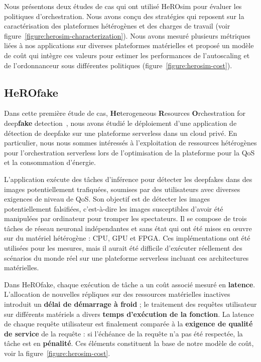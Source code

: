 Nous présentons deux études de cas qui ont utilisé HeROsim pour évaluer les politiques d'orchestration.
Nous avons conçu des stratégies qui reposent sur la caractérisation des plateformes hétérogènes et des charges de travail (voir figure~\ref{figure:herosim-characterization}). Nous avons mesuré plusieurs métriques liées à nos applications sur diverses plateformes matérielles et proposé un modèle de coût qui intègre ces valeurs pour estimer les performances de l'autoscaling et de l'ordonnanceur sous différentes politiques (figure~\ref{figure:herosim-cost}).

\subsection{HeROfake}

Dans cette première étude de cas, \textbf{He}terogeneous \textbf{R}esources \textbf{O}rchestration for deep\textbf{fake} detection~\cite{herofake}, nous avons étudié le déploiement d'une application de détection de deepfake sur une plateforme serverless dans un cloud privé. En particulier, nous nous sommes intéressés à l'exploitation de ressources hétérogènes pour l'orchestration serverless lors de l'optimisation de la plateforme pour la QoS et la consommation d'énergie.

L'application exécute des tâches d'inférence pour détecter les deepfakes dans des images potentiellement trafiquées, soumises par des utilisateurs avec diverses exigences de niveau de QoS. Son objectif est de détecter les images potentiellement falsifiées, c'est-à-dire les images susceptibles d'avoir été manipulées par ordinateur pour tromper les spectateurs. Il se compose de trois tâches de réseau neuronal indépendantes et sans état qui ont été mises en œuvre sur du matériel hétérogène : CPU, GPU et FPGA. Ces implémentations ont été utilisées pour les mesures, mais il aurait été difficile d'exécuter réellement des scénarios du monde réel sur une plateforme serverless incluant ces architectures matérielles.

Dans HeROfake, chaque exécution de tâche a un coût associé mesuré en \textbf{latence}. L'allocation de nouvelles répliques sur des ressources matérielles inactives introduit un \textbf{délai de démarrage à froid} ; le traitement des requêtes utilisateur sur différents matériels a divers \textbf{temps d'exécution de la fonction}. La latence de chaque requête utilisateur est finalement comparée à la \textbf{exigence de qualité de service} de la requête : si l'échéance de la requête n'a pas été respectée, la tâche est en \textbf{pénalité}. Ces éléments constituent la base de notre modèle de coût, voir la figure~\ref{figure:herosim-cost}.

